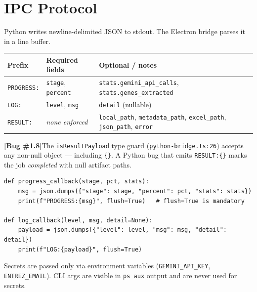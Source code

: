 \documentclass[11pt,a4paper]{article}
\newcommand{\warnbox}[2]{%
  \vspace{0.4em}
  \noindent\colorbox{LightRed}{\parbox{\dimexpr\linewidth-2\fboxsep}{%
    \small\color{DarkRed}\textbf{[#1]}\quad #2}}
  \vspace{0.4em}
}
\newcommand{\codefile}[1]{\texttt{\small\color{gray}#1}}
\begin{document}
\section{IPC Protocol}

Python writes newline-delimited JSON to stdout. The Electron bridge parses it in a line buffer.

\begin{center}
\begin{tabular}{lll}
\toprule
\textbf{Prefix} & \textbf{Required fields} & \textbf{Optional / notes} \\
\midrule
\texttt{PROGRESS:} & \texttt{stage}, \texttt{percent} & \texttt{stats.gemini\_api\_calls}, \texttt{stats.genes\_extracted} \\
\texttt{LOG:}      & \texttt{level}, \texttt{msg}     & \texttt{detail} (nullable) \\
\texttt{RESULT:}   & \textit{none enforced}            & \texttt{local\_path}, \texttt{metadata\_path}, \texttt{excel\_path}, \texttt{json\_path}, \texttt{error} \\
\bottomrule
\end{tabular}
\end{center}

\warnbox{Bug \#1.8}{The \texttt{isResultPayload} type guard (\codefile{python-bridge.ts:26}) accepts any non-null object --- including \texttt{\{\}}. A Python bug that emits \texttt{RESULT:\{\}} marks the job \textit{completed} with null artifact paths.}

\begin{lstlisting}[style=python,caption={\codefile{run\_pipeline.py:46--52} --- Emit protocol with mandatory flush}]
def progress_callback(stage, pct, stats):
    msg = json.dumps({"stage": stage, "percent": pct, "stats": stats})
    print(f"PROGRESS:{msg}", flush=True)   # flush=True is mandatory

def log_callback(level, msg, detail=None):
    payload = json.dumps({"level": level, "msg": msg, "detail": detail})
    print(f"LOG:{payload}", flush=True)
\end{lstlisting}

Secrets are passed only via environment variables (\texttt{GEMINI\_API\_KEY}, \texttt{ENTREZ\_EMAIL}). CLI args are visible in \texttt{ps aux} output and are never used for secrets.

\end{document}
